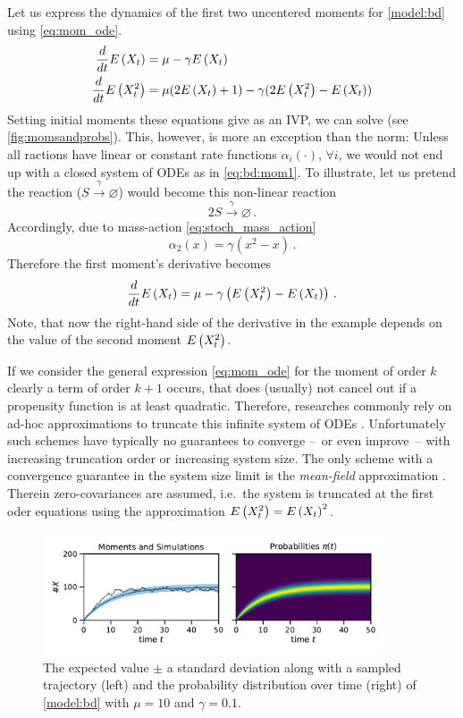 \begin{example} Let us express the dynamics of the first two uncentered moments for \autoref{model:bd} using \eqref{eq:mom_ode}.
\begin{equation}\label{eq:bd:mom1}
	\begin{split}
	\frac{d}{dt}\E{X_t} =\; &\mu - \gamma \E{X_t}\\
	\frac{d}{dt}\E{X_t^2} =\; &\mu(2\E{X_t} + 1) - \gamma (2\E{X_t^2}-\E{X_t})%
	\end{split}
\end{equation}
Setting initial moments these equations give as an \ac{IVP}, we can solve (see \autoref{fig:momsandprobs}).
This, however, is more an exception than the norm:
Unless all ractions have linear or constant rate functions $\alpha_i(\cdot)$, $\forall i$, we would not end up with a closed system of \acp{ODE} as in \eqref{eq:bd:mom1}.
To illustrate, let us pretend the reaction ($S\xrightarrow{\gamma}\varnothing$) would become this non-linear reaction
	\[
2S\xrightarrow{\gamma}\varnothing\,.
\]
Accordingly, due to mass-action \eqref{eq:stoch_mass_action}
	\[
\alpha_2(x)=\gamma (x^2 - x)\,.
\]
Therefore the first moment's derivative becomes
	\[
\frac{d}{dt}{E}\left(X_t\right) =\mu - \gamma \left({E}\left(X_t^2\right) - {E}\left(X_t\right)\right)\,.
\]
Note, that now the right-hand side of the derivative in the example depends on the value of the second moment ${E}\left(X_t^2\right)$.
\end{example}
If we consider the general expression \eqref{eq:mom_ode} for the moment of order $k$ clearly a term of order $k+1$ occurs, that does (usually) not cancel out if a propensity function is at least
quadratic.
Therefore, researches commonly rely on ad-hoc approximations to truncate this infinite system of \acp{ODE} \cite{hespanha2008moment,schnoerr2015,schnoerr2014validity}.
Unfortunately such schemes have typically no guarantees to converge --~or even improve~-- with increasing truncation order \cite{schnoerr2014validity} or increasing system size.
The only scheme with a convergence guarantee in the system size limit is the \emph{mean-field} approximation \cite{bortolussi2013continuous}.
Therein zero-covariances are assumed, i.e.\ the system is truncated at the first oder equations using the approximation ${E}\left(X_t^2\right)={E}\left(X_t\right)^2$.
\begin{figure}[htb]
	\centering
	\includegraphics[width=0.9\textwidth]{gfx/momsandprobs.pdf}
	\caption[Moments and probability distribution $\pi(t)$]{\label{fig:momsandprobs}The expected value $\pm$ a standard deviation along with a sampled trajectory (left) and the probability distribution over time (right) of \autoref{model:bd} with $\mu=10$ and $\gamma=0.1$.}
\end{figure}

